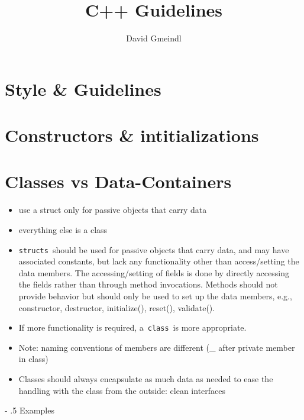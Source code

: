 \documentclass[
10pt,
a4paper,
parskip=half,	%
DIV=0,			%
BCOR=10mm
]{scrartcl}
\author{David Gmeindl}
\title{C++ Guidelines}
\makeatletter
\renewcommand\paragraph{%
	\@startsection{paragraph}{4}{0mm}%
	{-\baselineskip}%
	{.5\baselineskip}%
	{\normalfont\normalsize\bfseries}}
\newcommand{\ttt}[1]{\texttt{#1}}
\makeatother
\begin{document}
	
	
	\pagestyle{empty}
	\maketitle
	\tableofcontents
	\thispagestyle{empty}
	
	\newpage
	\pagebreak
	
	\pagestyle{scrheadings}
	
\section{Style \& Guidelines}

	
\section{Constructors \& intitializations}
	


\section{Classes vs Data-Containers}

\begin{itemize}
	\item use a struct only for passive objects that carry data
	\item everything else is a class
	\item \ttt{structs} should be used for passive objects that carry data, and may have associated constants, but lack any functionality other than access/setting the data members. The accessing/setting of fields is done by directly accessing the fields rather than through method invocations. Methods should not provide behavior but should only be used to set up the data members, e.g., constructor, destructor, initialize(), reset(), validate().
	\item If more functionality is required, a \ttt{class} is more appropriate.
	\item Note: naming conventions of members are different (\_ after private member in class)
	\item Classes should always encapsulate as much data as needed to ease the handling with the class from the outside: clean interfaces
\end{itemize}

\newpage
\paragraph{Examples}
\end{document}
